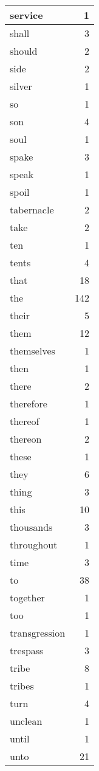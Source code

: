\begin{center}
\begin{longtable}{l|r}
service & 1\\ \hline 
shall & 3\\ \hline 
should & 2\\ \hline 
side & 2\\ \hline 
silver & 1\\ \hline 
so & 1\\ \hline 
son & 4\\ \hline 
soul & 1\\ \hline 
spake & 3\\ \hline 
speak & 1\\ \hline 
spoil & 1\\ \hline 
tabernacle & 2\\ \hline 
take & 2\\ \hline 
ten & 1\\ \hline 
tents & 4\\ \hline 
that & 18\\ \hline 
the & 142\\ \hline 
their & 5\\ \hline 
them & 12\\ \hline 
themselves & 1\\ \hline 
then & 1\\ \hline 
there & 2\\ \hline 
therefore & 1\\ \hline 
thereof & 1\\ \hline 
thereon & 2\\ \hline 
these & 1\\ \hline 
they & 6\\ \hline 
thing & 3\\ \hline 
this & 10\\ \hline 
thousands & 3\\ \hline 
throughout & 1\\ \hline 
time & 3\\ \hline 
to & 38\\ \hline 
together & 1\\ \hline 
too & 1\\ \hline 
transgression & 1\\ \hline 
trespass & 3\\ \hline 
tribe & 8\\ \hline 
tribes & 1\\ \hline 
turn & 4\\ \hline 
unclean & 1\\ \hline 
until & 1\\ \hline 
unto & 21\\ \hline 

\end{longtable}
\end{center}
